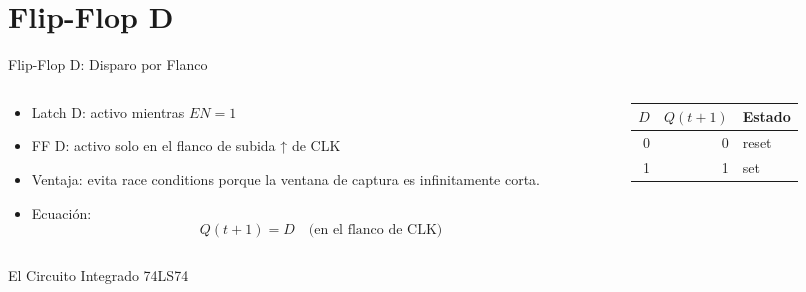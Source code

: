 \documentclass[presentation]{beamer}
\begin{document}
\section{Flip-Flop D}
\label{sec:org7ae6d22}

\begin{frame}[label={sec:org43a4126}]{Flip-Flop D: Disparo por Flanco}
\begin{columns}
\begin{column}{0.55\columnwidth}
\begin{itemize}
\item \alert{Latch D:} activo mientras \(EN=1\)
\item \alert{FF D:}    activo solo en el flanco de subida ↑ de CLK
\item Ventaja: evita race conditions porque la ventana de
captura es infinitamente corta.
\item Ecuación:
\[Q(t+1) = D \quad \text{(en el flanco de CLK)}\]
\end{itemize}
\end{column}

\begin{column}{0.45\columnwidth}
\begin{center}
\begin{tabular}{rrl}
\(D\) & \(Q(t+1)\) & Estado\\[0pt]
\hline
0 & 0 & reset\\[0pt]
1 & 1 & set\\[0pt]
\end{tabular}
\end{center}
\end{column}
\end{columns}
\end{frame}

\begin{frame}[label={sec:orgeba718a}]{El Circuito Integrado 74LS74}
\end{frame}
\end{document}
